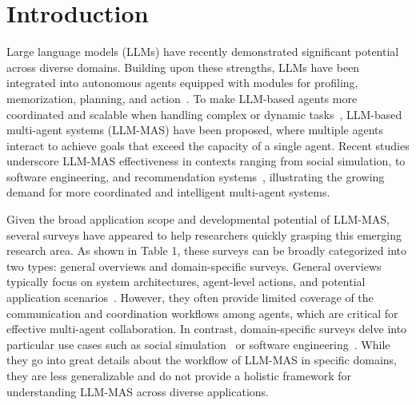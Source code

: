 \section{Introduction}
Large language models (LLMs) have recently demonstrated significant potential across diverse domains. Building upon these strengths, LLMs have been integrated into autonomous agents equipped with modules for profiling, memorization, planning, and action~\cite{llm_agent_define}. To make LLM-based agents more coordinated and scalable when handling complex or dynamic tasks~\cite{single_limit}, LLM-based multi-agent systems (LLM-MAS) have been proposed, where multiple agents interact to achieve goals that exceed the capacity of a single agent. Recent studies underscore LLM-MAS effectiveness in contexts ranging from social simulation\cite{social_media_regulation}, to software engineering\cite{metagpt}, and recommendation systems~\cite{jd_recommendation_system}, illustrating the growing demand for more coordinated and intelligent multi-agent systems. 



Given the broad application scope and developmental potential of LLM-MAS, several surveys have appeared to help researchers quickly grasping this emerging research area. As shown in Table 1, these surveys can be broadly categorized into two types: general overviews and domain-specific surveys. General overviews typically focus on system architectures, agent-level actions, and potential application scenarios~\cite{mas_survey_1,mas_survey_2,mas_survey_3}. However, they often provide limited coverage of the communication and coordination workflows among agents, which are critical for effective multi-agent collaboration. In contrast, domain-specific surveys delve into particular use cases such as social simulation~\cite{mas_application_survey_simulation} or software engineering~\cite{mas_application_survey_1,mas_application_survey_2}. While they go into great details about the workflow of LLM-MAS in specific domains, they are less generalizable and do not provide a holistic framework for understanding LLM-MAS across diverse applications.



